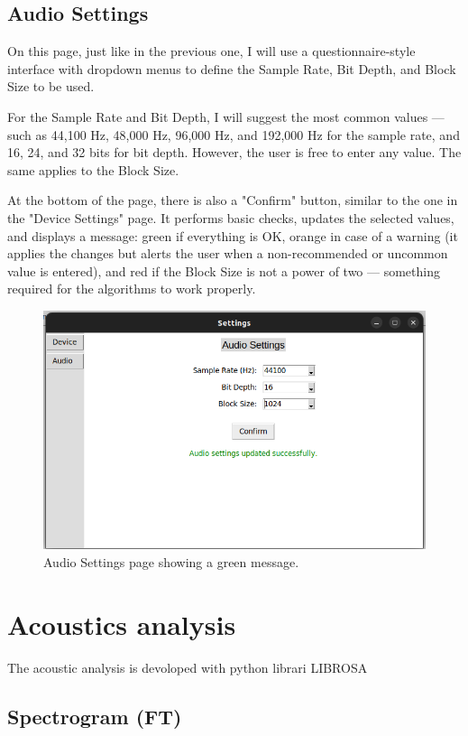 \subsection{Audio Settings}

On this page, just like in the previous one, I will use a questionnaire-style interface with dropdown menus to define the Sample Rate, Bit Depth, and Block Size to be used.

For the Sample Rate and Bit Depth, I will suggest the most common values — such as 44,100 Hz, 48,000 Hz, 96,000 Hz, and 192,000 Hz for the sample rate, and 16, 24, and 32 bits for bit depth. However, the user is free to enter any value. The same applies to the Block Size.

At the bottom of the page, there is also a "Confirm" button, similar to the one in the "Device Settings" page. It performs basic checks, updates the selected values, and displays a message: green if everything is OK, orange in case of a warning (it applies the changes but alerts the user when a non-recommended or uncommon value is entered), and red if the Block Size is not a power of two — something required for the algorithms to work properly.

\begin{figure}[H]
	\centering
	\includegraphics[width=0.8
	\linewidth]{Figures/AudSet.png}
	\caption{Audio Settings page showing a green message.}
	\label{fig:Audio Settings}
\end{figure}



\section{Acoustics analysis}

The acoustic analysis is devoloped with python librari LIBROSA\cite{librosa}

\subsection{Spectrogram (FT)}

